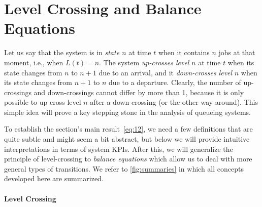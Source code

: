 \section{Level Crossing and Balance Equations}
\label{sec:level-cross-balance}

Let us say that the system is in \emph{state $n$} at time $t$ when it contains $n$ jobs at that moment, i.e., when $L(t) = n$.
The system \emph{up-crosses level} $n$ at time $t$ when its state changes from $n$ to $n+1$ due to an arrival, and it \emph{down-crosses level} $n$ when its state changes from $n+1$ to $n$ due to a departure.
Clearly, the number of up-crossings and down-crossings cannot differ by more than 1, because it is only possible to up-cross level $n$ after a down-crossing (or the other way around).
This simple idea will prove a key stepping stone in the analysis of queueing systems.

To establish the section's main result~\cref{eq:12}, we need a few definitions that are quite subtle and might seem a bit abstract, but below we will provide intuitive interpretations in terms of system KPIs.
After this, we will generalize the principle of level-crossing to \emph{balance equations} which allow us to deal with more general types of transitions.
We refer to \cref{fig:summaries} in which all concepts developed here are summarized.





\paragraph{Level Crossing}

